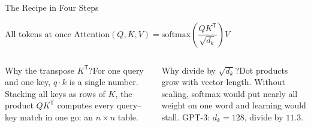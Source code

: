 \documentclass[aspectratio=169,10pt]{beamer}
\begin{document}
\begin{frame}{The Recipe in Four Steps}
\begin{fbx}{All tokens at once}
$\text{Attention}(Q,K,V)=\text{softmax}\!\left(\dfrac{QK^{\mathsf T}}{\sqrt{d_k}}\right)V$
\end{fbx}
\begin{columns}[T]
\begin{cbox}{Why the transpose $K^{\mathsf T}$?}\scriptsize For one query and one key, $q\cdot k$ is a single number. Stacking all keys as rows of $K$, the product $QK^{\mathsf T}$ computes every query--key match in one go: an $n\times n$ table.\end{cbox}
\begin{cbox}{Why divide by $\sqrt{d_k}$?}\scriptsize Dot products grow with vector length. Without scaling, softmax would put nearly all weight on one word and learning would stall. GPT-3: $d_k=128$, divide by $11.3$.\end{cbox}
\end{columns}
\end{frame}
\end{document}
